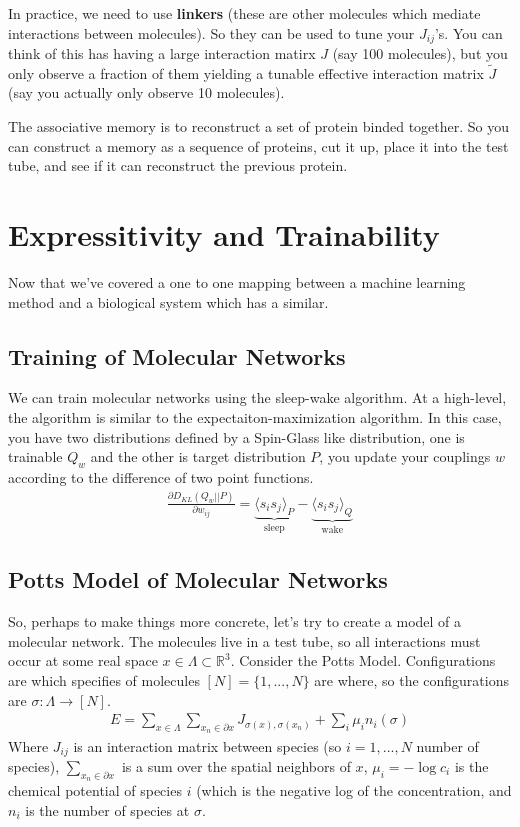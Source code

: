 In practice, we need to use \textbf{linkers} (these are other molecules which mediate interactions between molecules). So they can be used to tune your $J_{ij}$'s. You can think of this has having a large interaction matirx $J$ (say 100 molecules), but you only observe a fraction of them yielding a tunable effective interaction matrix $\tilde J$ (say you actually only observe 10 molecules).

The associative memory is to reconstruct a set of protein binded together. So you can construct a memory as a sequence of proteins, cut it up, place it into the test tube, and see if it can reconstruct the previous protein.

\section{Expressitivity and Trainability}
Now that we've covered a one to one mapping between a machine learning method and a biological system which has a similar.
\subsection{Training of Molecular Networks}
We can train molecular networks using the sleep-wake algorithm. At a high-level, the algorithm is similar to the expectaiton-maximization algorithm. In this case, you have two distributions defined by a Spin-Glass like distribution, one is trainable $Q_{w}$ and the other is target distribution $P$, you update your couplings $w$ according to the difference of two point functions.
\begin{align}
	\frac{\partial D_{KL}(Q_{w} || P)}{\partial w_{ij}} = \underbrace{\langle s_i s_j \rangle_P}_{\text{sleep}} - \underbrace{\langle s_i s_j \rangle_Q}_{\text{wake}}
\end{align}


\subsection{Potts Model of Molecular Networks}
So, perhaps to make things more concrete, let's try to create a model of a molecular network. The molecules live in a test tube, so all interactions must occur at some real space $x \in \Lambda \subset \mathbb R^3$.  Consider the Potts Model. Configurations are which specifies of molecules $[N]=\{1,...,N\}$ are where, so the configurations are $\sigma: \Lambda \to [N]$. 
\begin{align}
	E = \sum_{x \in \Lambda} \sum_{x_n \in \partial x} J_{\sigma(x), \sigma(x_n)} + \sum_i \mu_i n_i(\sigma)
\end{align}
Where $J_{ij}$ is an interaction matrix between species (so $i = 1,..., N$ number of species), $\sum_{x_n \in \partial x}$ is a sum over the spatial neighbors of $x$, $\mu_i = - \log c_i$ is the chemical potential of species $i$ (which is the negative log of the concentration, and $n_i$ is the number of species at $\sigma$.

